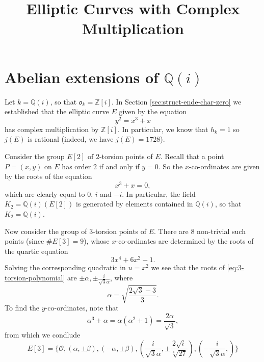 \documentclass{article}
\title{Elliptic Curves with Complex Multiplication}
\theoremstyle{definition}
\begin{document}
\section{Abelian extensions of $\mathbb{Q}(i)$}
\label{sec:abel-extens-Qi}

Let $k = \mathbb{Q}(i)$, so that $\mathfrak{o}_{k} = \mathbb{Z}[i]$.  In Section
\ref{sec:struct-ende-char-zero} we established that the elliptic curve $E$ given by
the equation
\begin{equation*}
  y^{2} = x^{3} + x
\end{equation*}
has complex multiplication by $\mathbb{Z}[i]$.  In particular, we know that $h_{k} =
1$ so $j(E)$ is rational (indeed, we have $j(E) = 1728$).

Consider the group $E[2]$ of $2$-torsion points of $E$.  Recall that a point $P =
(x,y)$ on $E$ has order $2$ if and only if $y = 0$.  So the $x$-co-ordinates are
given by the roots of the equation
\begin{equation*}
  x^{3} + x = 0,
\end{equation*}
which are clearly equal to $0$, $i$ and $-i$.  In particular, the field $K_{2} =
\mathbb{Q}(i)(E[2])$ is generated by elements contained in $\mathbb{Q}(i)$, so that
$K_{2} = \mathbb{Q}(i)$.

Now consider the group of $3$-torsion points of $E$.  There are $8$ non-trivial such
points (since $ \# E[3] = 9$), whose $x$-co-ordinates are determined by the roots of
the quartic equation
\begin{equation}
  \label{eq:3-torsion-polynomial}
  3x^{4} + 6x^{2} - 1.
\end{equation}
Solving the corresponding quadratic in $u = x^{2}$ we see that the roots of
\eqref{eq:3-torsion-polynomial} are $\pm \alpha, \pm \frac{i}{\sqrt{3}\alpha}$, where
\begin{equation*}
  \alpha = \sqrt{ \frac{2\sqrt{3} - 3}{3} }.
\end{equation*}
To find the $y$-co-ordinates, note that
\begin{equation*}
  \alpha^{3} + \alpha = \alpha(\alpha^{2} + 1) = \frac{2\alpha}{\sqrt{3}},
\end{equation*}
from which we condlude
\begin{equation*}
  E[3] = \{ \mathcal{O}, (\alpha,\pm \beta), (-\alpha, \pm \beta),
  (\frac{i}{\sqrt{3}\alpha}, \pm \frac{2 \sqrt{i}}{\sqrt[4]{27}} ), (-\frac{i}{\sqrt{3}\alpha}, )  \}
\end{equation*}



\end{document}

